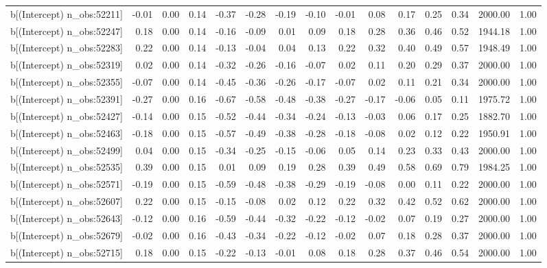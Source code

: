 \begin{table}[ht]
\begin{tabular}{rrrrrrrrrrrrrrr}
  b[(Intercept) n\_obs:52211] & -0.01 & 0.00 & 0.14 & -0.37 & -0.28 & -0.19 & -0.10 & -0.01 & 0.08 & 0.17 & 0.25 & 0.34 & 2000.00 & 1.00 \\ 
  b[(Intercept) n\_obs:52247] & 0.18 & 0.00 & 0.14 & -0.16 & -0.09 & 0.01 & 0.09 & 0.18 & 0.28 & 0.36 & 0.46 & 0.52 & 1944.18 & 1.00 \\ 
  b[(Intercept) n\_obs:52283] & 0.22 & 0.00 & 0.14 & -0.13 & -0.04 & 0.04 & 0.13 & 0.22 & 0.32 & 0.40 & 0.49 & 0.57 & 1948.49 & 1.00 \\ 
  b[(Intercept) n\_obs:52319] & 0.02 & 0.00 & 0.14 & -0.32 & -0.26 & -0.16 & -0.07 & 0.02 & 0.11 & 0.20 & 0.29 & 0.37 & 2000.00 & 1.00 \\ 
  b[(Intercept) n\_obs:52355] & -0.07 & 0.00 & 0.14 & -0.45 & -0.36 & -0.26 & -0.17 & -0.07 & 0.02 & 0.11 & 0.21 & 0.34 & 2000.00 & 1.00 \\ 
  b[(Intercept) n\_obs:52391] & -0.27 & 0.00 & 0.16 & -0.67 & -0.58 & -0.48 & -0.38 & -0.27 & -0.17 & -0.06 & 0.05 & 0.11 & 1975.72 & 1.00 \\ 
  b[(Intercept) n\_obs:52427] & -0.14 & 0.00 & 0.15 & -0.52 & -0.44 & -0.34 & -0.24 & -0.13 & -0.03 & 0.06 & 0.17 & 0.25 & 1882.70 & 1.00 \\ 
  b[(Intercept) n\_obs:52463] & -0.18 & 0.00 & 0.15 & -0.57 & -0.49 & -0.38 & -0.28 & -0.18 & -0.08 & 0.02 & 0.12 & 0.22 & 1950.91 & 1.00 \\ 
  b[(Intercept) n\_obs:52499] & 0.04 & 0.00 & 0.15 & -0.34 & -0.25 & -0.15 & -0.06 & 0.05 & 0.14 & 0.23 & 0.33 & 0.43 & 2000.00 & 1.00 \\ 
  b[(Intercept) n\_obs:52535] & 0.39 & 0.00 & 0.15 & 0.01 & 0.09 & 0.19 & 0.28 & 0.39 & 0.49 & 0.58 & 0.69 & 0.79 & 1984.25 & 1.00 \\ 
  b[(Intercept) n\_obs:52571] & -0.19 & 0.00 & 0.15 & -0.59 & -0.48 & -0.38 & -0.29 & -0.19 & -0.08 & 0.00 & 0.11 & 0.22 & 2000.00 & 1.00 \\ 
  b[(Intercept) n\_obs:52607] & 0.22 & 0.00 & 0.15 & -0.15 & -0.08 & 0.02 & 0.12 & 0.22 & 0.32 & 0.42 & 0.52 & 0.62 & 2000.00 & 1.00 \\ 
  b[(Intercept) n\_obs:52643] & -0.12 & 0.00 & 0.16 & -0.59 & -0.44 & -0.32 & -0.22 & -0.12 & -0.02 & 0.07 & 0.19 & 0.27 & 2000.00 & 1.00 \\ 
  b[(Intercept) n\_obs:52679] & -0.02 & 0.00 & 0.16 & -0.43 & -0.34 & -0.22 & -0.12 & -0.02 & 0.07 & 0.18 & 0.28 & 0.37 & 2000.00 & 1.00 \\ 
  b[(Intercept) n\_obs:52715] & 0.18 & 0.00 & 0.15 & -0.22 & -0.13 & -0.01 & 0.08 & 0.18 & 0.28 & 0.37 & 0.46 & 0.54 & 2000.00 & 1.00 \\ 

\end{tabular}
\end{table}
